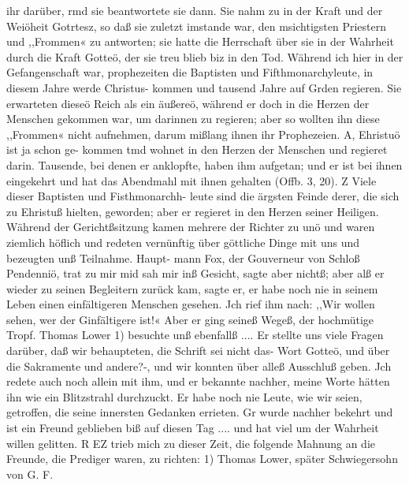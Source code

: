ihr darüber, rmd sie beantwortete sie dann. Sie nahm zu in der
Kraft und der Weiöheit Gotrtesz, so daß sie zuletzt imstande war,
den msichtigsten Priestern und ,,Frommen« zu antworten; sie hatte
die Herrschaft über sie in der Wahrheit durch die Kraft Gotteö,
der sie treu blieb biz in den Tod.
Während ich hier in der Gefangenschaft war, prophezeiten
die Baptisten und Fifthmonarchyleute, in diesem Jahre werde
Christus- kommen und tausend Jahre auf Grden regieren. Sie
erwarteten dieseö Reich als ein äußereö, während er doch in die
Herzen der Menschen gekommen war, um darinnen zu regieren;
aber so wollten ihn diese ,,Frommen« nicht aufnehmen, darum
mißlang ihnen ihr Prophezeien. A, Ehristuö ist ja schon ge-
kommen tmd wohnet in den Herzen der Menschen und regieret
darin. Tausende, bei denen er anklopfte, haben ihm aufgetan;
und er ist bei ihnen eingekehrt und hat das Abendmahl mit ihnen
gehalten (Offb. 3, 20). Z Viele dieser Baptisten und Fisthmonarchh-
leute sind die ärgsten Feinde derer, die sich zu Ehristuß hielten,
geworden; aber er regieret in den Herzen seiner Heiligen.
Während der Gerichtßsitzung kamen mehrere der Richter zu
unö und waren ziemlich höflich und redeten vernünftig über
göttliche Dinge mit uns und bezeugten unß Teilnahme. Haupt-
mann Fox, der Gouverneur von Schloß Pendenniö, trat zu mir
mid sah mir inß Gesicht, sagte aber nichtß; aber alß er wieder
zu seinen Begleitern zurück kam, sagte er, er habe noch nie in
seinem Leben einen einfältigeren Menschen gesehen. Jch rief ihm
nach: ,,Wir wollen sehen, wer der Ginfältigere ist!« Aber er
ging seineß Wegeß, der hochmütige Tropf.
Thomas Lower 1) besuchte unß ebenfallß .... Er stellte uns
viele Fragen darüber, daß wir behaupteten, die Schrift sei nicht
das- Wort Gotteö, und über die Sakramente und andere?-, und
wir konnten über alleß Ausschluß geben. Jch redete auch noch
allein mit ihm, und er bekannte nachher, meine Worte hätten
ihn wie ein Blitzstrahl durchzuckt. Er habe noch nie Leute, wie
wir seien, getroffen, die seine innersten Gedanken errieten. Gr
wurde nachher bekehrt und ist ein Freund geblieben biß auf diesen
Tag .... und hat viel um der Wahrheit willen gelitten. R
EZ trieb mich zu dieser Zeit, die folgende Mahnung an die
Freunde, die Prediger waren, zu richten:
1) Thomas Lower, später Schwiegersohn von G. F.


